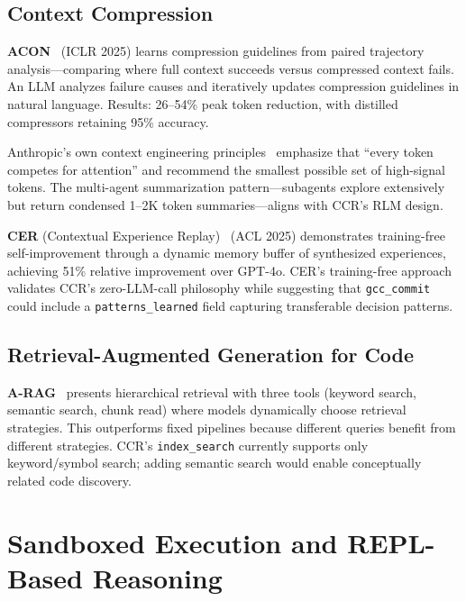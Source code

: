\documentclass[11pt]{article}
\begin{document}
\subsection{Context Compression}

\textbf{ACON}~\cite{acon} (ICLR 2025) learns compression guidelines from paired trajectory analysis---comparing where full context succeeds versus compressed context fails. An LLM analyzes failure causes and iteratively updates compression guidelines in natural language. Results: 26--54\% peak token reduction, with distilled compressors retaining 95\% accuracy.

Anthropic's own context engineering principles~\cite{anthropic_ce} emphasize that ``every token competes for attention'' and recommend the smallest possible set of high-signal tokens. The multi-agent summarization pattern---subagents explore extensively but return condensed 1--2K token summaries---aligns with CCR's RLM design.

\textbf{CER} (Contextual Experience Replay)~\cite{cer} (ACL 2025) demonstrates training-free self-improvement through a dynamic memory buffer of synthesized experiences, achieving 51\% relative improvement over GPT-4o. CER's training-free approach validates CCR's zero-LLM-call philosophy while suggesting that \texttt{gcc\_commit} could include a \texttt{patterns\_learned} field capturing transferable decision patterns.

\subsection{Retrieval-Augmented Generation for Code}

\textbf{A-RAG}~\cite{arag} presents hierarchical retrieval with three tools (keyword search, semantic search, chunk read) where models dynamically choose retrieval strategies. This outperforms fixed pipelines because different queries benefit from different strategies. CCR's \texttt{index\_search} currently supports only keyword/symbol search; adding semantic search would enable conceptually related code discovery.

\section{Sandboxed Execution and REPL-Based Reasoning}
\label{sec:sandbox}
\end{document}
